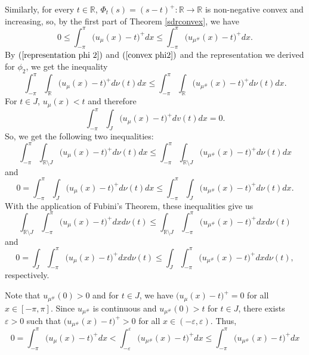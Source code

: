\documentclass[11pt]{amsart}
\numberwithin{equation}{section}
\begin{document}
Similarly, for every \(t\in\mathbb{R}\), \(\Phi_t(s)=(s-t)^+:\mathbb{R}\to\mathbb{R}\) is non-negative convex and increasing, so, by the first part of Theorem \ref{sdrconvex}, we have
\begin{equation}\label{convex positive part}
0\leq\int_{-\pi}^\pi\bigl(u_\mu(x)-t\bigr)^+dx\leq\int_{-\pi}^\pi\bigl(u_{\mu^\#}(x)-t\bigr)^+dx.
\end{equation}
By \((\ref{representation phi 2})\) and \((\ref{convex phi2})\) and the representation we derived for \(\phi_2\), we get the inequality
\begin{equation}
\int_{-\pi}^\pi\int_\mathbb{R}\bigl(u_\mu(x)-t\bigr)^+d\nu(t)dx\leq\int_{-\pi}^\pi\int_\mathbb{R}\bigl(u_{\mu^\#}(x)-t\bigr)^+d\nu(t)dx.
\end{equation}
For \(t\in J\), \(u_\mu(x)<t\) and therefore
\[\int_{-\pi}^\pi\int_J \bigl(u_\mu(x)-t\bigr)^+dv(t)dx=0.\]
So, we get the following two inequalities:
\begin{equation*}
\int_{-\pi}^\pi\int_{\mathbb{R}\setminus J}\bigl(u_\mu(x)-t\bigr)^+d\nu(t)dx\leq\int_{-\pi}^\pi\int_{\mathbb{R}\setminus J}\bigl(u_{\mu^\#}(x)-t\bigr)^+d\nu(t)dx
\end{equation*}
and
\begin{equation*}
0=\int_{-\pi}^\pi\int_J\bigl(u_\mu(x)-t\bigr)^+d\nu(t)dx\leq\int_{-\pi}^\pi\int_J\bigl(u_{\mu^\#}(x)-t\bigr)^+d\nu(t)dx.
\end{equation*}
With the application of Fubini's Theorem, these inequalities give us
\begin{equation}\label{ineq eksw apo to J}
\int_{\mathbb{R}\setminus J}\int_{-\pi}^\pi\bigl(u_\mu(x)-t\bigr)^+dxd\nu(t)\leq\int_{\mathbb{R}\setminus J}\int_{-\pi}^\pi\bigl(u_{\mu^\#}(x)-t\bigr)^+dxd\nu(t)
\end{equation}
and
\begin{equation*}
0=\int_J\int_{-\pi}^\pi\bigl(u_\mu(x)-t\bigr)^+dxd\nu(t)\leq\int_J\int_{-\pi}^\pi\bigl(u_{\mu^\#}(x)-t\bigr)^+dxd\nu(t),
\end{equation*}
respectively.
\par Note that \(u_{\mu^\#}(0)>0\) and for \(t\in J\), we have \(\bigl(u_\mu(x)-t\bigr)^+=0\) for all \(x\in[-\pi,\pi]\). Since \(u_{\mu^\#}\) is continuous and \(u_{\mu^\#}(0)>t\) for \(t\in J\), there exists \(\varepsilon>0\) such that \(\bigl(u_{\mu^\#}(x)-t\bigr)^+>0\) for all \(x\in(-\varepsilon,\varepsilon)\). Thus, 
\begin{equation*}
0=\int_{-\pi}^\pi\bigl(u_\mu(x)-t\bigr)^+dx<\int_{-\varepsilon}^\varepsilon\bigl(u_{\mu^\#}(x)-t\bigr)^+dx\leq\int_{-\pi}^\pi\bigl(u_{\mu^\#}(x)-t\bigr)^+dx
\end{equation*}
\end{document}
